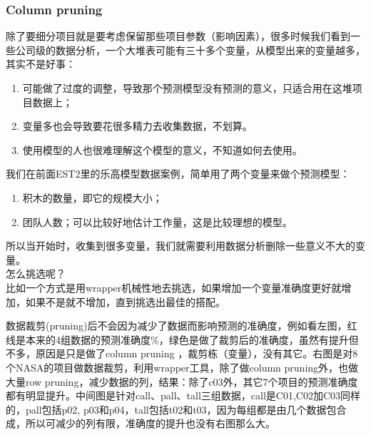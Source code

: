 \hypertarget{column-pruning}{%
\subsubsection{Column pruning}\label{column-pruning}}

除了要细分项目就是要考虑保留那些项目参数（影响因素），很多时候我们看到一些公司级的数据分析，一个大堆表可能有三十多个变量，从模型出来的变量越多，其实不是好事：

\begin{enumerate}
\tightlist
\item
  可能做了过度的调整，导致那个预测模型没有预测的意义，只适合用在这堆项目数据上；
\item
  变量多也会导致要花很多精力去收集数据，不划算。
\item
  使用模型的人也很难理解这个模型的意义，不知道如何去使用。\\
\end{enumerate}

我们在前面EST2里的乐高模型数据案例，简单用了两个变量来做个预测模型：

\begin{enumerate}
\tightlist
\item
  积木的数量，即它的规模大小；
\item
  团队人数；可以比较好地估计工作量，这是比较理想的模型。\\
\end{enumerate}

所以当开始时，收集到很多变量，我们就需要利用数据分析删除一些意义不大的变量。\\
怎么挑选呢？\\
比如一个方式是用wrapper机械性地去挑选，如果增加一个变量准确度更好就增加，如果不是就不增加，直到挑选出最佳的搭配。

数据裁剪(pruning)后不会因为减少了数据而影响预测的准确度，例如看左图，红线是本来的4组数据的预测准确度\%，绿色是做了裁剪后的准确度，虽然有提升但不多，原因是只是做了column
pruning
，裁剪栋（变量），没有其它。右图是对8个NASA的项目做数据裁剪，利用wrapper工具，除了做column
pruning外，也做大量row
pruning，减少数据的列，结果：除了c03外，其它7个项目的预测准确度都有明显提升。中间图是针对call、pall、tall三组数据，call是C01,C02加C03同样的，pall包括p02,
p03和p04，tall包括t02和t03，因为每组都是由几个数据包合成，所以可减少的列有限，准确度的提升也没有右图那么大。


